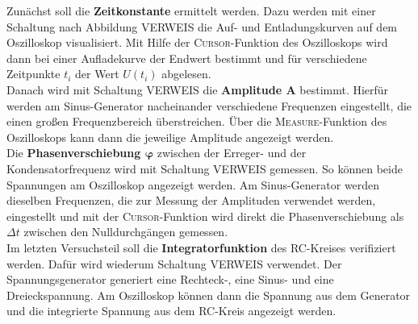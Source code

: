 Zunächst soll die \textbf{Zeitkonstante} ermittelt werden. Dazu werden mit einer Schaltung nach Abbildung VERWEIS die Auf- und Entladungskurven auf dem Oszilloskop visualisiert. Mit Hilfe der \textsc{Cursor}-Funktion des Oszilloskops wird dann bei einer Aufladekurve der Endwert bestimmt und für verschiedene Zeitpunkte $t_i$ der Wert $U(t_i)$ abgelesen. \\
Danach wird mit Schaltung VERWEIS die \textbf{Amplitude $\bm{A}$} bestimmt. Hierfür werden am Sinus-Generator nacheinander verschiedene Frequenzen eingestellt, die einen großen Frequenzbereich überstreichen. Über die \textsc{Measure}-Funktion des Oszilloskops kann dann die jeweilige Amplitude angezeigt werden. \\
Die \textbf{Phasenverschiebung $\bm{\varphi}$} zwischen der Erreger- und der Kondensatorfrequenz wird mit Schaltung VERWEIS gemessen. So können beide Spannungen am Oszilloskop angezeigt werden. Am Sinus-Generator werden dieselben Frequenzen, die zur Messung der Amplituden verwendet werden, eingestellt und mit der \textsc{Cursor}-Funktion wird direkt die Phasenverschiebung als $\Delta t$ zwischen den Nulldurchgängen gemessen. \\
Im letzten Versuchsteil soll die \textbf{Integratorfunktion} des RC-Kreises verifiziert werden. Dafür wird wiederum Schaltung VERWEIS verwendet. Der Spannungsgenerator generiert eine Rechteck-, eine Sinus- und eine Dreieckspannung. Am Oszilloskop können dann die Spannung aus dem Generator und die integrierte Spannung aus dem RC-Kreis angezeigt werden.